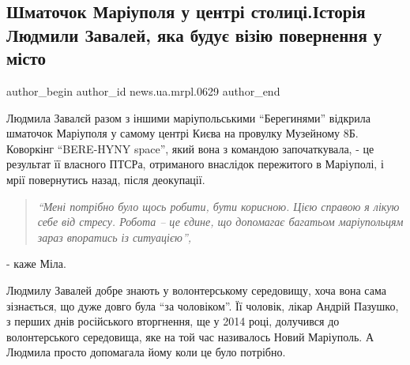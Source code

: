  
 
 
 
 
 
\subsection{Шматочок Маріуполя у центрі столиці.\titlebreak Історія Людмили Завалей, яка будує візію повернення у місто}
\label{sec:10_08_2023.stz.news.ua.mrpl.0629.1.ljudmyla_zavalej}
 
\ifcmt
 author_begin
   author_id news.ua.mrpl.0629
 author_end
\fi


\begin{qqquote}
Людмила Завалєй разом з іншими маріупольськими \enquote{Берегинями} відкрила шматочок
Маріуполя у самому центрі Києва на провулку Музейному 8Б. Коворкінг
\enquote{BERE\hyp{}HYNY space}, який вона з командою започаткувала,  - це результат
її власного ПТСРа, отриманого внаслідок пережитого в Маріуполі, і мрії
повернутись назад, після деокупації. 
\end{qqquote}

\begin{quote}
\em\enquote{Мені потрібно було щось робити, бути корисною. Цією справою я лікую себе від
стресу. Робота – це єдине, що допомагає багатьом маріупольцям зараз впоратись
із ситуацією}, 
\end{quote}
- каже Міла.

Людмилу Завалей добре знають у волонтерському середовищу, хоча вона сама
зізнається, що дуже довго була \enquote{за чоловіком}. Її чоловік, лікар Андрій
Пазушко, з перших днів російського вторгнення, ще у 2014 році, долучився  до
волонтерського середовища, яке на той час називалось Новий Маріуполь. А Людмила
просто допомагала йому коли це було потрібно. 

